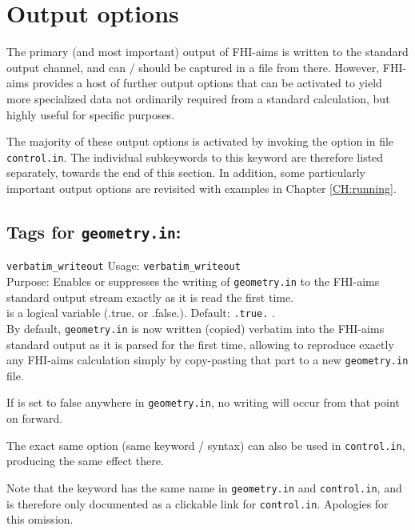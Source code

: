 
\section{Output options}
\label{section output}

The primary (and most important) output of FHI-aims is written to the
standard output channel, and can / should be captured in a file from
there. However, FHI-aims provides a host of further output options
that can be activated to yield more specialized data not ordinarily
required from a standard calculation, but highly useful for specific
purposes. 

The majority of these output options is activated by invoking the 
 option in file \texttt{control.in}. The individual
subkeywords to this keyword are therefore listed separately, towards
the end of this section. In addition, some particularly important
output options are revisited with examples in Chapter
\ref{CH:running}. 

\newpage

\subsection*{Tags for \texttt{geometry.in}:}

\texttt{verbatim\_writeout}
{
  \noindent
  Usage: \texttt{verbatim\_writeout}  \\[1.0ex]
  Purpose: Enables or suppresses the writing of \texttt{geometry.in} to
  the FHI-aims standard output stream exactly as it is read the first
  time. \\[1.0ex] 
   is a logical variable (.true. or .false.). Default: \texttt{.true.} . \\
}
By default, \texttt{geometry.in} is now written (copied) verbatim into
the FHI-aims standard output as it is parsed for the first time,
allowing to reproduce exactly any FHI-aims calculation simply by
copy-pasting that part to a new \texttt{geometry.in} file.

If  is set to false anywhere in
\texttt{geometry.in}, no writing will occur from that point on
forward. 

The exact same option (same keyword / syntax) can also be used in
\texttt{control.in}, producing the same effect there.

Note that the keyword has the same name in \texttt{geometry.in} and
\texttt{control.in}, and is therefore only documented as a clickable
link for \texttt{control.in}. Apologies for this omission.


